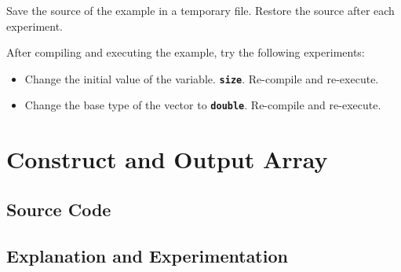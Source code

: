 \documentclass{report}
\begin{document}
\begin{hashitemize}

\end{hashitemize}

Save the source of the example in a temporary file.
Restore the source after each experiment.

After compiling and executing the example, try the following experiments:
\begin{itemize}
\item
Change the initial value of the variable.
\texttt{{\bf size}}.
Re-compile and re-execute.
\item
Change the base type of the vector to
\texttt{{\bf double}}.
Re-compile and re-execute.
\end{itemize}


\pagebreak
\section{Construct and Output Array}

\subsection{Source Code}



\subsection{Explanation and Experimentation}
\end{document}
